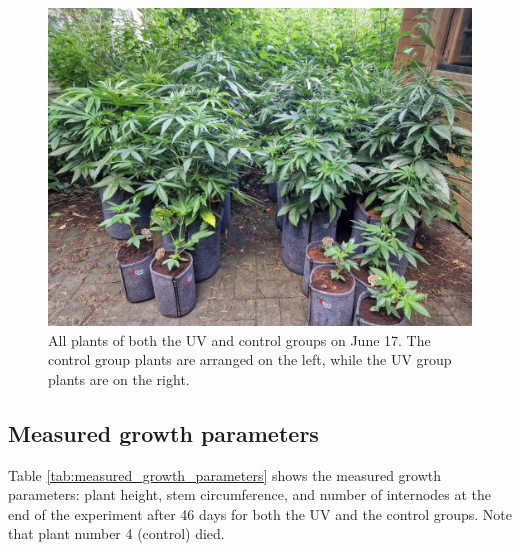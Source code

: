 \begin{figure}[htbp]
    \includegraphics[width=0.62\linewidth]{plant_all_2024-06-17}
    \caption[Plants of both the UV and control groups on June 17]{All plants of both the UV and control groups on June 17. The control group plants are arranged on the left, while the UV group plants are on the right.}
    \label{fig:plant_all_2024-06-17}
\end{figure}

\subsection{Measured growth parameters}

Table \ref{tab:measured_growth_parameters} shows the measured growth parameters: plant height, stem circumference, and number of internodes at the end of the experiment after \num[mode=text]{46} days for both the UV and the control groups. Note that plant number \num[mode=text]{4} (control) died.

